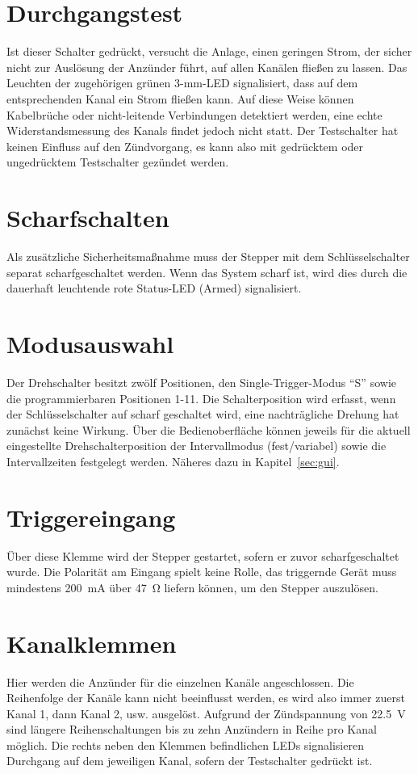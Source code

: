 \documentclass[paper=a4, open=any]{scrbook}
\begin{document}
			\section{Durchgangstest}

				Ist dieser Schalter gedrückt, versucht die Anlage, einen geringen Strom, der sicher nicht zur Auslösung der Anzünder führt, auf allen Kanälen fließen zu lassen. Das Leuchten der zugehörigen grünen 3-mm-LED signalisiert, dass auf dem entsprechenden Kanal ein Strom fließen kann. Auf diese Weise können Kabelbrüche oder nicht-leitende Verbindungen detektiert werden, eine echte Widerstandsmessung des Kanals findet jedoch nicht statt. Der Testschalter hat keinen Einfluss auf den Zündvorgang, es kann also mit gedrücktem oder ungedrücktem Testschalter gezündet werden.

			\section{Scharfschalten}

				Als zusätzliche Sicherheitsmaßnahme muss der Stepper mit dem Schlüsselschalter separat scharfgeschaltet werden. Wenn das System scharf ist, wird dies durch die dauerhaft leuchtende rote Status-LED (Armed) signalisiert.

			\section{Modusauswahl}
				Der Drehschalter besitzt zwölf Positionen, den Single-Trigger-Modus \enquote{S} sowie die programmierbaren Positionen 1-11. Die Schalterposition wird erfasst, wenn der Schlüsselschalter auf scharf geschaltet wird, eine nachträgliche Drehung hat zunächst keine Wirkung. Über die Bedienoberfläche können jeweils für die aktuell eingestellte Drehschalterposition der Intervallmodus (fest/variabel) sowie die Intervallzeiten festgelegt werden. Näheres dazu in Kapitel~\ref{sec:gui}.

			\section{Triggereingang}
				Über diese Klemme wird der Stepper gestartet, sofern er zuvor scharfgeschaltet wurde. Die Polarität am Eingang spielt keine Rolle, das triggernde Gerät muss mindestens \SI{200}{\milli\ampere} über \SI{47}{\ohm} liefern können, um den Stepper auszulösen.

			\section{Kanalklemmen}
				Hier werden die Anzünder für die einzelnen Kanäle angeschlossen. Die Reihenfolge der Kanäle kann nicht beeinflusst werden, es wird also immer zuerst Kanal 1, dann Kanal 2, usw. ausgelöst. Aufgrund der Zündspannung von \SI{22,5}{\volt} sind längere Reihenschaltungen bis zu zehn Anzündern in Reihe pro Kanal möglich. Die rechts neben den Klemmen befindlichen LEDs signalisieren Durchgang auf dem jeweiligen Kanal, sofern der Testschalter gedrückt ist.
\end{document}
